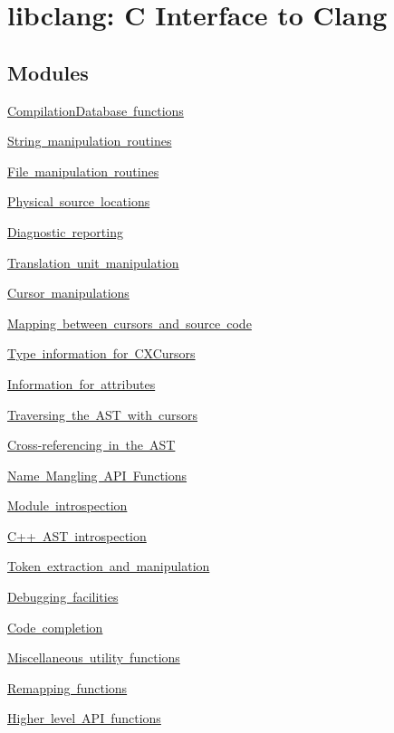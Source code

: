 \hypertarget{group__CINDEX}{}\section{libclang\+: C Interface to Clang}
\label{group__CINDEX}
\subsection*{Modules}
\begin{DoxyCompactItemize}
\item 
\mbox{\hyperlink{group__COMPILATIONDB}{Compilation\+Database functions}}
\item 
\mbox{\hyperlink{group__CINDEX__STRING}{String manipulation routines}}
\item 
\mbox{\hyperlink{group__CINDEX__FILES}{File manipulation routines}}
\item 
\mbox{\hyperlink{group__CINDEX__LOCATIONS}{Physical source locations}}
\item 
\mbox{\hyperlink{group__CINDEX__DIAG}{Diagnostic reporting}}
\item 
\mbox{\hyperlink{group__CINDEX__TRANSLATION__UNIT}{Translation unit manipulation}}
\item 
\mbox{\hyperlink{group__CINDEX__CURSOR__MANIP}{Cursor manipulations}}
\item 
\mbox{\hyperlink{group__CINDEX__CURSOR__SOURCE}{Mapping between cursors and source code}}
\item 
\mbox{\hyperlink{group__CINDEX__TYPES}{Type information for C\+X\+Cursors}}
\item 
\mbox{\hyperlink{group__CINDEX__ATTRIBUTES}{Information for attributes}}
\item 
\mbox{\hyperlink{group__CINDEX__CURSOR__TRAVERSAL}{Traversing the A\+S\+T with cursors}}
\item 
\mbox{\hyperlink{group__CINDEX__CURSOR__XREF}{Cross-\/referencing in the A\+ST}}
\item 
\mbox{\hyperlink{group__CINDEX__MANGLE}{Name Mangling A\+P\+I Functions}}
\item 
\mbox{\hyperlink{group__CINDEX__MODULE}{Module introspection}}
\item 
\mbox{\hyperlink{group__CINDEX__CPP}{C++ A\+S\+T introspection}}
\item 
\mbox{\hyperlink{group__CINDEX__LEX}{Token extraction and manipulation}}
\item 
\mbox{\hyperlink{group__CINDEX__DEBUG}{Debugging facilities}}
\item 
\mbox{\hyperlink{group__CINDEX__CODE__COMPLET}{Code completion}}
\item 
\mbox{\hyperlink{group__CINDEX__MISC}{Miscellaneous utility functions}}
\item 
\mbox{\hyperlink{group__CINDEX__REMAPPING}{Remapping functions}}
\item 
\mbox{\hyperlink{group__CINDEX__HIGH}{Higher level A\+P\+I functions}}
\end{DoxyCompactItemize}
